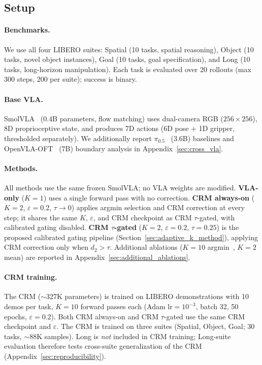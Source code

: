 \subsection{Setup}
\label{sec:exp_setup}

\paragraph{Benchmarks.}
We use all four LIBERO suites: Spatial (10 tasks, spatial reasoning), Object (10 tasks, novel object instances), Goal (10 tasks, goal specification), and Long (10 tasks, long-horizon manipulation). Each task is evaluated over 20 rollouts (max 300 steps, 200 per suite); success is binary.

\paragraph{Base VLA.}
SmolVLA~\cite{shukor2025smolvla} (0.4B parameters, flow matching) uses dual-camera RGB ($256{\times}256$), 8D proprioceptive state, and produces 7D actions (6D pose + 1D gripper, thresholded separately). We additionally report $\pi_{0.5}$~\cite{black2025pi05} (3.6B) baselines and OpenVLA-OFT~\cite{kim2024openvla} (7B) boundary analysis in Appendix~\ref{sec:cross_vla}.

\paragraph{Methods.}
All methods use the same frozen SmolVLA; no VLA weights are modified. \textbf{VLA-only} ($K{=}1$) uses a single forward pass with no correction. \textbf{CRM always-on} ($K{=}2$, $\varepsilon{=}0.2$, $\tau{\to}0$) applies argmin selection and CRM correction at every step; it shares the same $K$, $\varepsilon$, and CRM checkpoint as CRM $\tau$-gated, with calibrated gating disabled. \textbf{CRM $\tau$-gated} ($K{=}2$, $\varepsilon{=}0.2$, $\tau{=}0.25$) is the proposed calibrated gating pipeline (Section~\ref{sec:adaptive_k_method}), applying CRM correction only when $d_2 > \tau$.
Additional ablations ($K{=}10$ argmin~\cite{chen2026reconvla}, $K{=}2$ mean) are reported in Appendix~\ref{sec:additional_ablations}.

\paragraph{CRM training.}
The CRM (${\sim}$327K parameters) is trained on LIBERO demonstrations with 10 demos per task, $K{=}10$ forward passes each (Adam $\mathrm{lr}{=}10^{-3}$, batch 32, 50 epochs, $\varepsilon{=}0.2$). Both CRM always-on and CRM $\tau$-gated use the same CRM checkpoint and $\varepsilon$. The CRM is trained on three suites (Spatial, Object, Goal; 30 tasks, ${\sim}$88K samples). Long is \emph{not} included in CRM training; Long-suite evaluation therefore tests cross-suite generalization of the CRM (Appendix~\ref{sec:reproducibility}).

